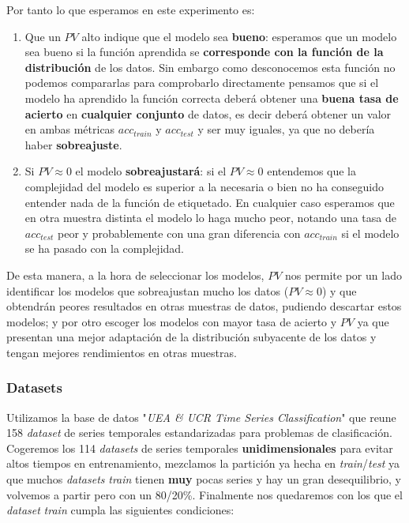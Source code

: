 Por tanto lo que esperamos en este experimento es:

\begin{enumerate}
  \item Que un $PV$ alto indique que el modelo sea \textbf{bueno}: esperamos que un modelo sea bueno si la función aprendida se \textbf{corresponde con la función de la distribución} de los datos. Sin embargo como desconocemos esta función no podemos compararlas para comprobarlo directamente pensamos que si el modelo ha aprendido la función correcta deberá obtener una \textbf{buena tasa de acierto} en \textbf{cualquier conjunto} de datos, es decir deberá obtener un valor en ambas métricas $acc_{train}$ y $acc_{test}$ y ser muy iguales, ya que no debería haber \textbf{sobreajuste}.

  \item Si $PV \approx 0$ el modelo \textbf{sobreajustará}: si el $PV \approx 0$ entendemos que la complejidad del modelo es superior a la necesaria o bien no ha conseguido entender nada de la función de etiquetado. En cualquier caso esperamos que en otra muestra distinta el modelo lo haga mucho peor, notando una tasa de $acc_{test}$ peor y probablemente con una gran diferencia con $acc_{train}$ si el modelo se ha pasado con la complejidad.
\end{enumerate}

De esta manera, a la hora de seleccionar los modelos, $PV$ nos permite por un lado identificar los modelos que sobreajustan mucho los datos ($PV \approx 0$) y que obtendrán peores resultados en otras muestras de datos, pudiendo descartar estos modelos; y por otro escoger los modelos con mayor tasa de acierto y $PV$ ya que presentan una mejor adaptación de la distribución subyacente de los datos y tengan mejores rendimientos en otras muestras.

\subsubsection{Datasets}

Utilizamos la base de datos "\emph{UEA \& UCR Time Series Classification}" \cite{bagnall2020ts} que reune 158 \emph{dataset} de series temporales estandarizadas para problemas de clasificación. Cogeremos los 114 \emph{datasets} de series temporales \textbf{unidimensionales} para evitar altos tiempos en entrenamiento, mezclamos la partición ya hecha en \emph{train}/\emph{test} ya que muchos \emph{datasets} \emph{train} tienen \textbf{muy} pocas series y hay un gran desequilibrio, y volvemos a partir pero con un 80/20\%. Finalmente nos quedaremos con los que el \emph{dataset} \emph{train} cumpla las siguientes condiciones:

